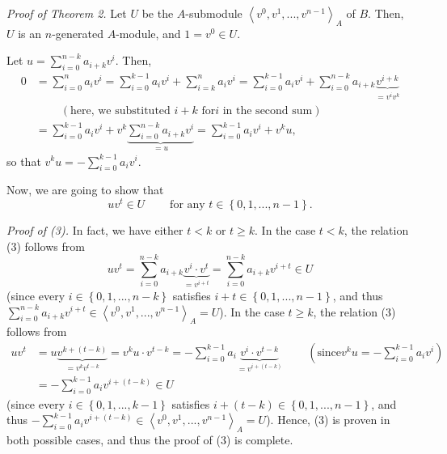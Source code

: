 \documentclass[12pt,final,notitlepage,onecolumn]{article}%
\begin{document}
\textit{Proof of Theorem 2.} Let $U$ be the $A$-submodule $\left\langle
v^{0},v^{1},...,v^{n-1}\right\rangle _{A}$ of $B$. Then, $U$ is an
$n$-generated $A$-module, and $1=v^{0}\in U$.

Let $u=\sum\limits_{i=0}^{n-k}a_{i+k}v^{i}$. Then,%
\begin{align*}
0  &  =\sum\limits_{i=0}^{n}a_{i}v^{i}=\sum\limits_{i=0}^{k-1}a_{i}v^{i}%
+\sum\limits_{i=k}^{n}a_{i}v^{i}=\sum\limits_{i=0}^{k-1}a_{i}v^{i}%
+\sum\limits_{i=0}^{n-k}a_{i+k}\underbrace{v^{i+k}}_{=v^{i}v^{k}}\\
&  \ \ \ \ \ \ \ \ \ \ \left(  \text{here, we substituted }i+k\text{ for
}i\text{\ in the second sum}\right) \\
&  =\sum\limits_{i=0}^{k-1}a_{i}v^{i}+v^{k}\underbrace{\sum\limits_{i=0}%
^{n-k}a_{i+k}v^{i}}_{=u}=\sum\limits_{i=0}^{k-1}a_{i}v^{i}+v^{k}u,
\end{align*}
so that $v^{k}u=-\sum\limits_{i=0}^{k-1}a_{i}v^{i}$.

Now, we are going to show that%
\begin{equation}
uv^{t}\in U\ \ \ \ \ \ \ \ \ \ \text{for any }t\in\left\{
0,1,...,n-1\right\}  . \label{3}%
\end{equation}


\textit{Proof of (3).} In fact, we have either $t<k$ or $t\geq k$. In the case
$t<k$, the relation (3) follows from%
\[
uv^{t}=\sum\limits_{i=0}^{n-k}a_{i+k}\underbrace{v^{i}\cdot v^{t}}_{=v^{i+t}%
}=\sum\limits_{i=0}^{n-k}a_{i+k}v^{i+t}\in U
\]
(since every $i\in\left\{  0,1,...,n-k\right\}  $ satisfies $i+t\in\left\{
0,1,...,n-1\right\}  $, and thus $\sum\limits_{i=0}^{n-k}a_{i+k}v^{i+t}%
\in\left\langle v^{0},v^{1},...,v^{n-1}\right\rangle _{A}=U$). In the case
$t\geq k$, the relation (3) follows from%
\begin{align*}
uv^{t}  &  =u\underbrace{v^{k+\left(  t-k\right)  }}_{=v^{k}v^{t-k}}%
=v^{k}u\cdot v^{t-k}=-\sum\limits_{i=0}^{k-1}a_{i}\underbrace{v^{i}\cdot
v^{t-k}}_{=v^{i+\left(  t-k\right)  }}\ \ \ \ \ \ \ \ \ \ \left(  \text{since
}v^{k}u=-\sum\limits_{i=0}^{k-1}a_{i}v^{i}\right) \\
&  =-\sum\limits_{i=0}^{k-1}a_{i}v^{i+\left(  t-k\right)  }\in U
\end{align*}
(since every $i\in\left\{  0,1,...,k-1\right\}  $ satisfies $i+\left(
t-k\right)  \in\left\{  0,1,...,n-1\right\}  $, and thus $-\sum\limits_{i=0}%
^{k-1}a_{i}v^{i+\left(  t-k\right)  }\in\left\langle v^{0},v^{1}%
,...,v^{n-1}\right\rangle _{A}=U$). Hence, (3) is proven in both possible
cases, and thus the proof of (3) is complete.
\end{document}
